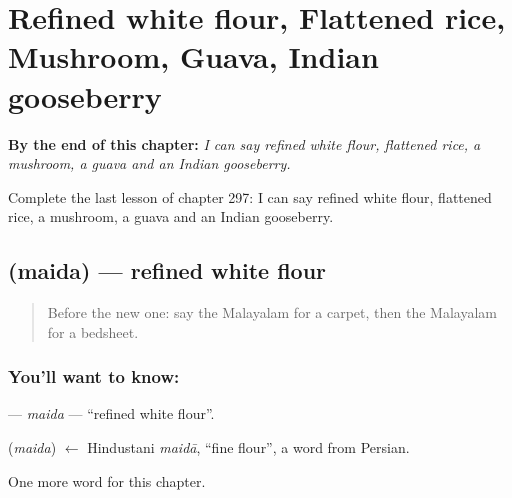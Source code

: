 
\chapter{Refined white flour, Flattened rice, Mushroom, Guava, Indian gooseberry}
\label{ch:ml-refined-white-flour-flattened-rice-mushroom-guava-indian-gooseberry}

\begin{chapteropening}
\textbf{By the end of this chapter:} \emph{I can say refined white flour, flattened rice, a mushroom, a guava and an Indian gooseberry.}

Complete the last lesson of chapter 297: I can say refined white flour, flattened rice, a mushroom, a guava and an Indian gooseberry.
\end{chapteropening}

\section[\texorpdfstring{\ml{മൈദ} (maida)}{മൈദ (maida)}]{ (maida) — refined white flour}

\label{lesson:ML-C297-maida}



\begin{quote}
Before the new one: say the Malayalam for a carpet, then the Malayalam for a bedsheet.
\end{quote}

\subsection*{You'll want to know: }
\textbf{} — \emph{maida} — \textquotedblleft{}refined white flour\textquotedblright{}.

\begin{cousinweb}
\textbf{} (\emph{maida}) $\leftarrow$ Hindustani \emph{maidā}, \textquotedblleft{}fine flour\textquotedblright{}, a word from Persian.
\end{cousinweb}

\begin{grammarlens}[title={What you've built}]
One more word for this chapter.
\end{grammarlens}

